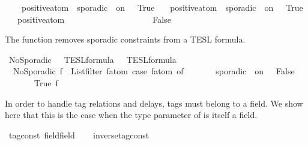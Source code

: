 \begin{isabellebody}
\ \ \ \ {\isacartoucheopen}positive{\isacharunderscore}atom\ {\isacharparenleft}{\isacharunderscore}\ sporadic\ {\isacharunderscore}\ on\ {\isacharunderscore}{\isacharparenright}\ {\isacharequal}\ True{\isacartoucheclose}\isanewline
\ \ {\isacharbar}\ {\isacartoucheopen}positive{\isacharunderscore}atom\ {\isacharparenleft}{\isacharunderscore}\ sporadic{\isasymsharp}\ {\isacharunderscore}\ on\ {\isacharunderscore}{\isacharparenright}\ {\isacharequal}\ True{\isacartoucheclose}\isanewline
\ \ {\isacharbar}\ {\isacartoucheopen}positive{\isacharunderscore}atom\ {\isacharunderscore}\ \ \ \ \ \ \ \ \ \ \ \ \ \ \ \ \ \ \ {\isacharequal}\ False{\isacartoucheclose}%
\begin{isamarkuptext}%
The  function removes sporadic constraints from a TESL formula.%
\end{isamarkuptext}\isamarkuptrue%
\isamarkupfalse%
\ NoSporadic\ {\isacharcolon}{\isacharcolon}\ {\isacartoucheopen}{\isacharprime}{\isasymtau}\ TESL{\isacharunderscore}formula\ {\isasymRightarrow}\ {\isacharprime}{\isasymtau}\ TESL{\isacharunderscore}formula{\isacartoucheclose}\isanewline
{}\ \isanewline
\ \ {\isacartoucheopen}NoSporadic\ f\ {\isasymequiv}\ {\isacharparenleft}List{\isachardot}filter\ {\isacharparenleft}{\isasymlambda}f\isactrlsub a\isactrlsub t\isactrlsub o\isactrlsub m{\isachardot}\ case\ f\isactrlsub a\isactrlsub t\isactrlsub o\isactrlsub m\ of\isanewline
\ \ \ \ \ \ {\isacharunderscore}\ sporadic\ {\isacharunderscore}\ on\ {\isacharunderscore}\ {\isasymRightarrow}\ False\isanewline
\ \ \ \ {\isacharbar}\ {\isacharunderscore}\ {\isasymRightarrow}\ True{\isacharparenright}\ f{\isacharparenright}{\isacartoucheclose}%
\isadelimdocument
%
\endisadelimdocument
%
\isatagdocument
%
\isamarkuptrue%
%
\endisatagdocument
{\isafolddocument}%
%
\isadelimdocument
%
\endisadelimdocument
%
\begin{isamarkuptext}%
In order to handle tag relations and delays, tags must belong to a field.
  We show here that this is the case when the type parameter of  
  is itself a field.%
\end{isamarkuptext}\isamarkuptrue%
\isamarkupfalse%
\ tag{\isacharunderscore}const\ {\isacharcolon}{\isacharcolon}{\isacharparenleft}field{\isacharparenright}field\isanewline
{}\isanewline
\ \ \isamarkupfalse%
\ inverse{\isacharunderscore}tag{\isacharunderscore}const\isanewline

\end{isabellebody}
